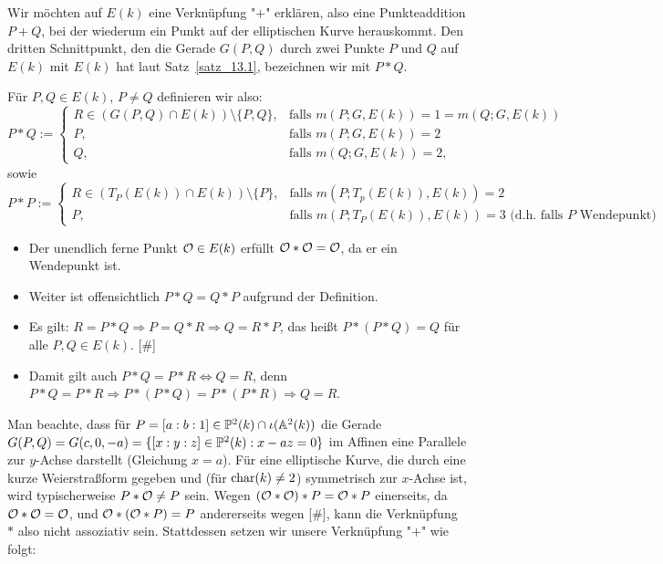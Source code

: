 Wir möchten auf $E(k)$ eine Verknüpfung "$+$" erklären, also eine Punkteaddition $P + Q$, bei der wiederum ein Punkt auf der elliptischen Kurve herauskommt. Den dritten Schnittpunkt, den die Gerade $G(P,Q)$ durch zwei Punkte $P$ und $Q$ auf $E(k)$ mit $E(k)$ hat laut Satz~\ref{satz_13.1}, bezeichnen wir mit $P * Q$.

\begin{defn}
\label{def_13.4}
	Für $P,Q \in E(k)$, $P \neq Q$ definieren wir also:
	\[ P * Q := \begin{cases}
		R \in (G(P,Q) \cap E(k)) \setminus \{P,Q\}, & \text{falls } m(P;G,E(k)) = 1 = m(Q;G,E(k)) \\
		P, & \text{falls } m(P;G,E(k)) = 2 \\
		Q, & \text{falls } m(Q;G,E(k)) = 2,
	\end{cases} \]
	sowie
	\[ P * P := \begin{cases}
		R \in (T_P(E(k)) \cap E(k)) \setminus \{P\}, & \text{falls } m(P;T_p(E(k)),E(k)) = 2 \\
		P, & \text{falls } m(P;T_P(E(k)),E(k)) = 3 \text{ (d.h. falls } P \text{ Wendepunkt)}
	\end{cases} \]
\end{defn}

\begin{bem}
	\begin{itemize}
		\item Der unendlich ferne Punkt $\mathcal{O} \in E(k)$ erfüllt $\mathcal{O} * \mathcal{O} = \mathcal{O}$, da er ein Wendepunkt ist.
		\item Weiter ist offensichtlich $P * Q = Q * P$ aufgrund der Definition.
		\item Es gilt: $R = P * Q \Rightarrow P = Q * R \Rightarrow Q = R * P$, das heißt $P * (P * Q) = Q$ für alle $P,Q \in E(k)$. \hfill [\#]
		\item Damit gilt auch $P * Q = P * R \Leftrightarrow Q = R$, denn $P * Q = P * R \Rightarrow P*(P*Q)=P*(P*R) \Rightarrow Q=R$.
	\end{itemize}
\end{bem}

\begin{bem}
	Man beachte, dass für $P = [a:b:1] \in \mathbb{P}^2(k) \cap \iota(\mathbb{A}^2(k))$ die Gerade $G(P,Q) = G(c,0,-a) = \{ [x:y:z] \in \mathbb{P}^2(k) : x - az = 0\}$ im Affinen eine Parallele zur $y$-Achse darstellt (Gleichung $x = a$). Für eine elliptische Kurve, die durch eine kurze Weierstraßform gegeben und (für $\operatorname{char}(k) \neq 2$) symmetrisch zur $x$-Achse ist, wird typischerweise $P * \mathcal{O} \neq P$ sein. Wegen $(\mathcal{O} * \mathcal{O}) * P = \mathcal{O} * P$ einerseits, da $\mathcal{O} * \mathcal{O} = \mathcal{O}$, und $\mathcal{O} * (\mathcal{O} * P) = P$ andererseits wegen [\#], kann die Verknüpfung $*$ also nicht assoziativ sein. Stattdessen setzen wir unsere Verknüpfung "$+$" wie folgt:
\end{bem}

